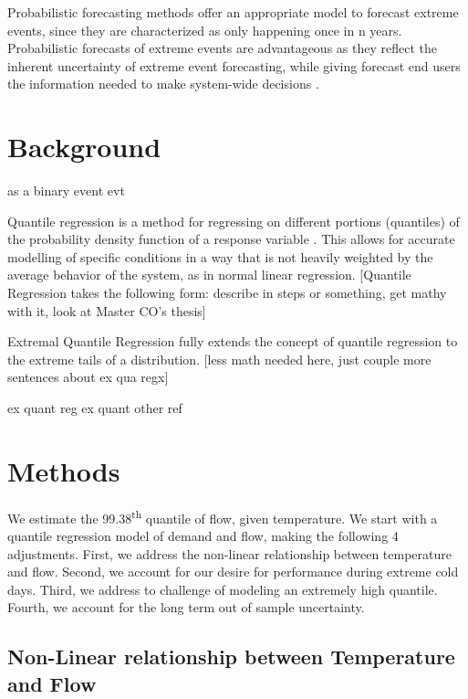 \documentclass{article}
\begin{document}
Probabilistic forecasting methods offer an appropriate model to forecast extreme events, since they are characterized as only happening once in n years. Probabilistic forecasts of extreme events are advantageous as they reflect the inherent uncertainty of extreme event forecasting, while giving forecast end users the information needed to make system-wide decisions \cite{murphy1991probabilities}.


\section{Background}
as a binary event\cite{toth2003probability}
evt\cite{kotz2000extreme}


Quantile regression is a method for regressing on different portions (quantiles) of the probability density function of a response variable \cite{koenker1978regression}. This allows for accurate modelling of specific conditions in a way that is not heavily weighted by the average behavior of the system, as in normal linear regression. [Quantile Regression takes the following form: describe in steps or something, get mathy with it, look at Master CO's thesis]


Extremal Quantile Regression fully extends the concept of quantile regression to the extreme tails of a distribution. [less math needed here, just couple more sentences about ex qua regx]

ex quant reg \cite{chernozhukov2005extremal}
ex quant other ref \cite{wang2012estimation}

\section{Methods}

We estimate the 99.38\textsuperscript{th} quantile of flow, given temperature. We start with a quantile regression model of demand and flow, making the following 4 adjustments. First, we address the non-linear relationship between temperature and flow. Second, we account for our desire for performance during extreme cold days. Third, we address to challenge of modeling an extremely high quantile. Fourth, we account for the long term out of sample uncertainty.

\subsection{Non-Linear relationship between Temperature and Flow}
\end{document}
